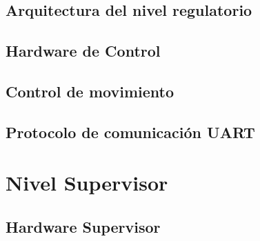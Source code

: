 \documentclass[a4paper,12pt]{report}
\begin{document}
\subsection{Arquitectura del nivel regulatorio}


\subsection{Hardware de Control}




% 
% 
% 

% 
% 

\subsection{Control de movimiento}




\subsection{Protocolo de comunicación UART}



\section{Nivel Supervisor}

\subsection{Hardware Supervisor}

\end{document}

